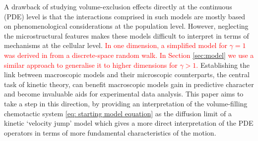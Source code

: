 \documentclass[review,onefignum,onetabnum]{siamart220329}
\begin{document}
A drawback of studying volume-exclusion effects directly at the continuous (PDE) level is that the interactions comprised in such models are mostly based on phenomenological considerations at the population level.  However, neglecting the microstructural features makes these models difficult to interpret in terms of mechanisms at the cellular level. \textcolor{red}{In one dimension, a simplified model for $\gamma=1$ was derived in \cite{painter2002volume} from a discrete-space random walk. In Section 
\ref{sec:model} we use a similar approach to generalise it to higher dimensions for $\gamma>1$.} Establishing the link between macroscopic models and their microscopic counterparts, the central task of kinetic theory, can benefit macroscopic models gain in predictive character and become invaluable aids for experimental data analysis. {This paper aims to take a step in this direction, by providing an interpretation of the volume-filling chemotactic system \cref{eq: starting model equation} as the diffusion limit of a kinetic {{`velocity jump'}} model which gives a more direct interpretation of the PDE operators in terms of more fundamental characteristics of the motion.} 
\end{document}
